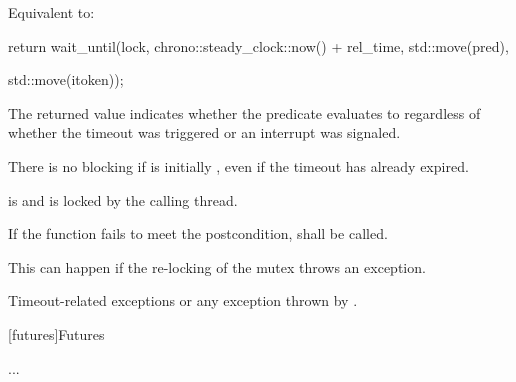 {\begin{itemdescr}
 \pnum \effects Equivalent to:
\begin{codeblock}
return wait_until(lock, chrono::steady_clock::now() + rel_time, std::move(pred),
\end{codeblock}
{\color{diffcolor}
\begin{codeblock}
                  std::move(itoken));
\end{codeblock}
}

 \pnum \begin{note} The returned value indicates whether the predicate evaluates to 
        regardless of whether the timeout was triggered 
        {\color{diffcolor} or an interrupt was signaled}. \end{note}

 \pnum \begin{note} There is no blocking if  is initially , even if the
        timeout has already expired. \end{note}

 \pnum \postconditions {} is  and 
        is locked by the calling thread.

 \pnum \remarks
        If the function fails to meet the postcondition, 
        shall be called.
        \begin{note} This can happen if the re-locking of the mutex throws an exception. \end{note}
 
 \pnum \throws Timeout-related
        exceptions or any exception thrown by .

\end{itemdescr}

}%


\vspace{5ex}

[futures]{Futures}

...

